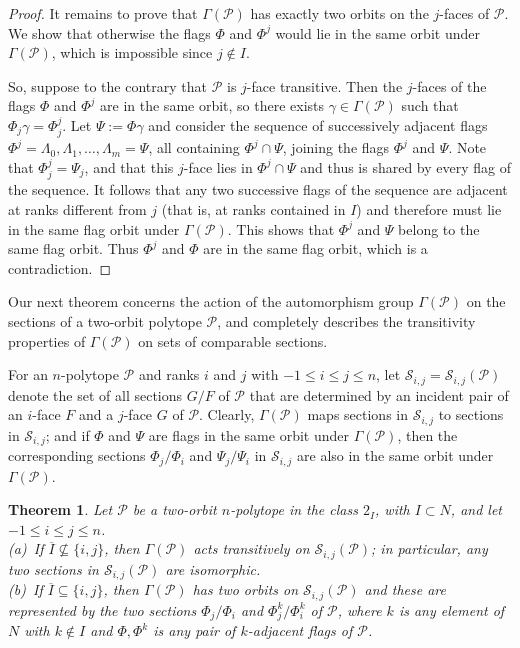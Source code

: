 \documentclass[12pt]{article}
\renewcommand{\bar}{\overline}
\renewcommand{\>}{\rangle}
\renewcommand{\leq}{\leqslant}
\newtheorem{theorem}{Theorem}[section]
\theoremstyle{definition}\newtheorem{definition}{Definition}[section]
\begin{document}
\begin{proof}
It remains to prove that $\Gamma(\mathcal{P})$ has exactly two orbits on the $j$-faces of $\mathcal{P}$. We show that otherwise the flags $\Phi$ and $\Phi^j$ would lie in the same orbit under $\Gamma(\mathcal{P})$, which is impossible since $j\notin I$. 

So, suppose to the contrary that $\mathcal{P}$ is $j$-face transitive. Then the $j$-faces of the flags $\Phi$ and $\Phi^j$ are in the same orbit, so there exists $\gamma\in\Gamma(\mathcal{P})$ such that $\Phi_j\gamma=\Phi^{j}_{j}$. Let $\Psi:=\Phi\gamma$ and consider the sequence of successively adjacent flags $\Phi^j=\Lambda_0,\Lambda_1,\ldots,\Lambda_m=\Psi$, all containing $\Phi^{j}\cap\Psi$, joining the flags $\Phi^j$ and $\Psi$. Note that $\Phi^{j}_{j}=\Psi_j$, and that this $j$-face lies in $\Phi^{j}\cap\Psi$ and thus is shared by every flag of the sequence. It follows that any two successive flags of the sequence are adjacent at ranks different from $j$ (that is, at ranks contained in $I$) and therefore must lie in the same flag orbit under $\Gamma(\mathcal{P})$. This shows that $\Phi^j$ and $\Psi$ belong to the same flag orbit. Thus $\Phi^j$ and $\Phi$ are in the same flag orbit, which is a contradiction.
\end{proof}
\medskip

Our next theorem concerns the action of the automorphism group $\Gamma(\mathcal{P})$ on the sections of a two-orbit polytope $\mathcal{P}$, and completely describes the transitivity properties of $\Gamma(\mathcal{P})$ on sets of comparable sections.

For an $n$-polytope $\mathcal{P}$ and ranks $i$ and $j$ with $-1 \leq i \leq j \leq n$, let $\mathcal{S}_{i,j}=\mathcal{S}_{i,j}(\mathcal{P})$ denote the set of all sections $G/F$ of $\mathcal{P}$ that are determined by an incident pair of an $i$-face $F$ and a $j$-face $G$ of $\mathcal{P}$. Clearly, $\Gamma(\mathcal{P})$ maps sections in $\mathcal{S}_{i,j}$ to sections in $\mathcal{S}_{i,j}$; and if $\Phi$ and $\Psi$ are flags in the same orbit under $\Gamma(\mathcal{P})$, then the corresponding sections $\Phi_{j}/\Phi_{i}$ and $\Psi_{j}/\Psi_{i}$ in $\mathcal{S}_{i,j}$ are also in the same orbit under $\Gamma(\mathcal{P})$.
\smallskip

\begin{theorem}
\label{sections}
Let $\mathcal{P}$ be a two-orbit $n$-polytope in the class $2_I$, with $I \subset N$, and let $-1 \leq i \leq j \leq n$.\\[.02in] 
(a)\ If $\bar{I} \not \subseteq \{i,j\}$, then $\Gamma(\mathcal{P})$ acts transitively on 
$\mathcal{S}_{i,j}(\mathcal{P})$; in particular, any two sections in $\mathcal{S}_{i,j}(\mathcal{P})$ are isomorphic.\\[.02in]
(b)\ If $\bar{I} \subseteq \{i,j\}$, then $\Gamma(\mathcal{P})$ has two orbits on $\mathcal{S}_{i,j}(\mathcal{P})$ and these are represented by the two sections $\Phi_{j}/\Phi_{i}$ and $\Phi_{j}^{k}/\Phi_{i}^{k}$ of $\mathcal{P}$, where $k$ is any element of $N$ with $k\notin I$ and $\Phi,\Phi^k$ is any pair of $k$-adjacent flags of $\mathcal{P}$.
\end{theorem}
\end{document}
